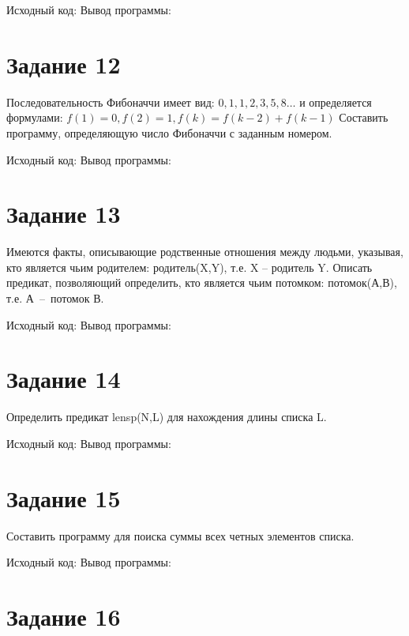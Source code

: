 \documentclass[a4paper,14pt]{article}
\begin{document}
    Исходный код:
    {\small {}}
    Вывод программы:
    {\small {}}


    \section*{Задание 12}

    Последовательность Фибоначчи имеет вид:    $0,1,1,2,3,5,8\dots$ и определяется формулами:
    $f(1) = 0, f(2) = 1, f(k )= f(k-2) + f(k-1)$
    Составить программу, определяющую число Фибоначчи с заданным номером.

    Исходный код:
    {\small {}}
    Вывод программы:
    {\small {}}


    \section*{Задание 13}

    Имеются факты, описывающие родственные отношения между людьми, указывая, кто является чьим родителем:
    родитель(X,Y), т.е. X -- родитель Y.
    Описать предикат, позволяющий определить, кто является чьим потомком:
    потомок(А,В), т.е. А~--~потомок В.


    Исходный код:
    {\small {}}
    Вывод программы:
    {\small {}}


    \section*{Задание 14}

    Определить предикат lensp(N,L) для нахождения длины списка L.

    Исходный код:
    {\small {}}
    Вывод программы:
    {\small {}}


    \section*{Задание 15}

    Составить программу для поиска суммы всех четных элементов списка.


    Исходный код:
    {\small {}}
    Вывод программы:
    {\small {}}


    \section*{Задание 16}
\end{document}
